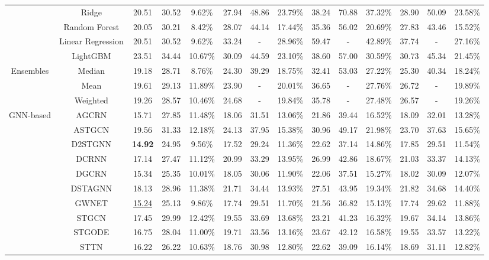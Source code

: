 \documentclass[10pt]{article}
\begin{document}
\begin{table}[t]
{\begin{tabular}{c|c|c|c|c|c|c|c|c|c|c|c|c|c}
& Ridge & 20.51 & 30.52 & 9.62\% & 27.94 & 48.86 & 23.79\% & 38.24 & 70.88 & 37.32\% & 28.90 & 50.09 & 23.58\% \\
& Random Forest & 20.05 & 30.21 & 8.42\% & 28.07 & 44.14 & 17.44\% & 35.36 & 56.02 & 20.69\% & 27.83 & 43.46 & 15.52\% \\
& Linear Regression & 20.51 & 30.52 & 9.62\% & 33.24 & - & 28.96\% & 59.47 & - & 42.89\% & 37.74 & - & 27.16\% \\
& LightGBM & 23.51 & 34.44 & 10.67\% & 30.09 & 44.59 & 23.10\% & 38.60 & 57.00 & 30.59\% & 30.73 & 45.34 & 21.45\% \\
\midrule
\multirow{3}{*}{Ensembles}
& Median & 19.18 & 28.71 & 8.76\% & 24.30 & 39.29 & 18.75\% & 32.41 & 53.03 & 27.22\% & 25.30 & 40.34 & 18.24\% \\
& Mean & 19.61 & 29.13 & 11.89\% & 23.90 & - & 20.01\% & 36.65 & - & 27.76\% & 26.72 & - & 19.89\% \\
& Weighted & 19.26 & 28.57 & 10.46\% & 24.68 & - & 19.84\% & 35.78 & - & 27.48\% & 26.57 & - & 19.26\% \\
\midrule
\multirow{10}{*}{GNN-based}
& AGCRN & 15.71 & 27.85 & 11.48\% & 18.06 & 31.51 & 13.06\% & 21.86 & 39.44 & 16.52\% & 18.09 & 32.01 & 13.28\% \\
& ASTGCN & 19.56 & 31.33 & 12.18\% & 24.13 & 37.95 & 15.38\% & 30.96 & 49.17 & 21.98\% & 23.70 & 37.63 & 15.65\% \\
& D2STGNN & \textbf{14.92} & 24.95 & 9.56\% & 17.52 & 29.24 & 11.36\% & 22.62 & 37.14 & 14.86\% & 17.85 & 29.51 & 11.54\% \\
& DCRNN & 17.14 & 27.47 & 11.12\% & 20.99 & 33.29 & 13.95\% & 26.99 & 42.86 & 18.67\% & 21.03 & 33.37 & 14.13\% \\
& DGCRN & 15.34 & 25.35 & 10.01\% & 18.05 & 30.06 & 11.90\% & 22.06 & 37.51 & 15.27\% & 18.02 & 30.09 & 12.07\% \\
& DSTAGNN & 18.13 & 28.96 & 11.38\% & 21.71 & 34.44 & 13.93\% & 27.51 & 43.95 & 19.34\% & 21.82 & 34.68 & 14.40\% \\
& GWNET & \underline{15.24} & 25.13 & 9.86\% & 17.74 & 29.51 & 11.70\% & 21.56 & 36.82 & 15.13\% & 17.74 & 29.62 & 11.88\% \\
& STGCN & 17.45 & 29.99 & 12.42\% & 19.55 & 33.69 & 13.68\% & 23.21 & 41.23 & 16.32\% & 19.67 & 34.14 & 13.86\% \\
& STGODE & 16.75 & 28.04 & 11.00\% & 19.71 & 33.56 & 13.16\% & 23.67 & 42.12 & 16.58\% & 19.55 & 33.57 & 13.22\% \\
& STTN & 16.22 & 26.22 & 10.63\% & 18.76 & 30.98 & 12.80\% & 22.62 & 39.09 & 16.14\% & 18.69 & 31.11 & 12.82\% \\

\end{tabular}}
\end{table}
\end{document}
